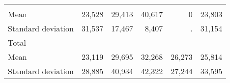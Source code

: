 \begin{tabular}{llllll}
  \multicolumn{1}{r}{} &
  \multicolumn{1}{r}{} &
  \multicolumn{1}{r}{} \\
\multicolumn{1}{l}{\hspace{4em}Mean} &
  \multicolumn{1}{|r}{23,528} &
  \multicolumn{1}{r}{29,413} &
  \multicolumn{1}{r}{40,617} &
  \multicolumn{1}{r}{0} &
  \multicolumn{1}{r}{23,803} \\
\multicolumn{1}{l}{\hspace{4em}Standard deviation} &
  \multicolumn{1}{|r}{31,537} &
  \multicolumn{1}{r}{17,467} &
  \multicolumn{1}{r}{8,407} &
  \multicolumn{1}{r}{.} &
  \multicolumn{1}{r}{31,154} \\
\multicolumn{1}{l}{\hspace{3em}Total} &
  \multicolumn{1}{|r}{} &
  \multicolumn{1}{r}{} &
  \multicolumn{1}{r}{} &
  \multicolumn{1}{r}{} &
  \multicolumn{1}{r}{} \\
\multicolumn{1}{l}{\hspace{4em}Mean} &
  \multicolumn{1}{|r}{23,119} &
  \multicolumn{1}{r}{29,695} &
  \multicolumn{1}{r}{32,268} &
  \multicolumn{1}{r}{26,273} &
  \multicolumn{1}{r}{25,814} \\
\multicolumn{1}{l}{\hspace{4em}Standard deviation} &
  \multicolumn{1}{|r}{28,885} &
  \multicolumn{1}{r}{40,934} &
  \multicolumn{1}{r}{42,322} &
  \multicolumn{1}{r}{27,244} &
  \multicolumn{1}{r}{33,595} \\
\cline{1-6}
\end{tabular}

